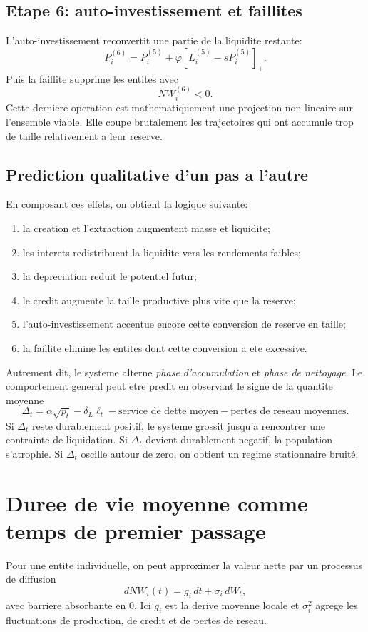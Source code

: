 \documentclass[11pt,a4paper]{article}
\begin{document}
\subsection{Etape 6: auto-investissement et faillites}
L'auto-investissement reconvertit une partie de la liquidite restante:
\[
P_i^{(6)} = P_i^{(5)} + \varphi[L_i^{(5)}-sP_i^{(5)}]_+.
\]
Puis la faillite supprime les entites avec
\[
NW_i^{(6)}<0.
\]
Cette derniere operation est mathematiquement une projection non lineaire sur l'ensemble viable. Elle coupe brutalement les trajectoires qui ont accumule trop de taille relativement a leur reserve.

\subsection{Prediction qualitative d'un pas a l'autre}
En composant ces effets, on obtient la logique suivante:
\begin{enumerate}
\item la creation et l'extraction augmentent masse et liquidite;
\item les interets redistribuent la liquidite vers les rendements faibles;
\item la depreciation reduit le potentiel futur;
\item le credit augmente la taille productive plus vite que la reserve;
\item l'auto-investissement accentue encore cette conversion de reserve en taille;
\item la faillite elimine les entites dont cette conversion a ete excessive.
\end{enumerate}

Autrement dit, le systeme alterne \emph{phase d'accumulation} et \emph{phase de nettoyage}. Le comportement general peut etre predit en observant le signe de la quantite moyenne
\[
\Delta_t = \alpha\sqrt{p_t}
-\delta_L\ell_t
-\text{service de dette moyen}
-\text{pertes de reseau moyennes}.
\]
Si $\Delta_t$ reste durablement positif, le systeme grossit jusqu'a rencontrer une contrainte de liquidation. Si $\Delta_t$ devient durablement negatif, la population s'atrophie. Si $\Delta_t$ oscille autour de zero, on obtient un regime stationnaire bruité.

\section{Duree de vie moyenne comme temps de premier passage}
Pour une entite individuelle, on peut approximer la valeur nette par un processus de diffusion
\[
dNW_i(t)=g_i\,dt+\sigma_i\,dW_t,
\]
avec barriere absorbante en $0$. Ici $g_i$ est la derive moyenne locale et $\sigma_i^2$ agrege les fluctuations de production, de credit et de pertes de reseau.
\end{document}
